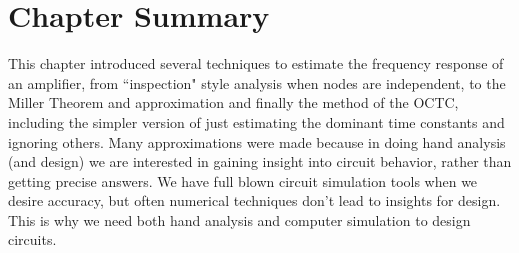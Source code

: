 \section{Chapter Summary}
This chapter introduced several techniques to estimate the frequency response of an amplifier, from ``inspection" style analysis when nodes are independent, to the Miller Theorem and approximation and finally the method of the OCTC, including the simpler version of just estimating the dominant time constants and ignoring others.  Many approximations were made because in doing hand analysis (and design) we are interested in gaining insight into circuit behavior, rather than getting precise answers.  We have full blown circuit simulation tools when we desire accuracy, but often numerical techniques don't lead to insights for design.  This is why we need both hand analysis and computer simulation to design circuits.
